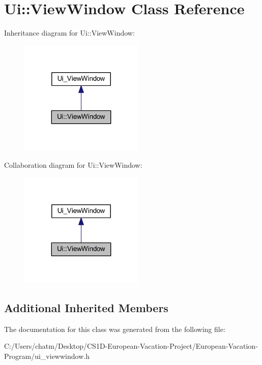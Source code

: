 \hypertarget{class_ui_1_1_view_window}{}\section{Ui\+::View\+Window Class Reference}
\label{class_ui_1_1_view_window}


Inheritance diagram for Ui\+::View\+Window\+:
\nopagebreak
\begin{figure}[H]
\begin{center}
\leavevmode
\includegraphics[width=167pt]{class_ui_1_1_view_window__inherit__graph}
\end{center}
\end{figure}


Collaboration diagram for Ui\+::View\+Window\+:
\nopagebreak
\begin{figure}[H]
\begin{center}
\leavevmode
\includegraphics[width=167pt]{class_ui_1_1_view_window__coll__graph}
\end{center}
\end{figure}
\subsection*{Additional Inherited Members}


The documentation for this class was generated from the following file\+:\begin{DoxyCompactItemize}
\item 
C\+:/\+Users/chatm/\+Desktop/\+C\+S1\+D-\/\+European-\/\+Vacation-\/\+Project/\+European-\/\+Vacation-\/\+Program/ui\+\_\+viewwindow.\+h\end{DoxyCompactItemize}

